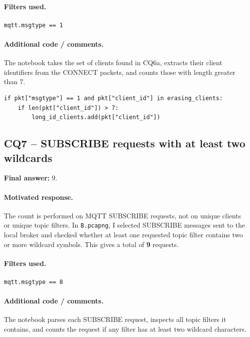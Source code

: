 \documentclass[11pt,a4paper]{article}
\begin{document}
\paragraph{Filters used.}
\begin{verbatim}
mqtt.msgtype == 1
\end{verbatim}

\paragraph{Additional code / comments.}
The notebook takes the set of clients found in CQ6a, extracts their client identifiers from the
CONNECT packets, and counts those with length greater than 7.

\begin{verbatim}
if pkt["msgtype"] == 1 and pkt["client_id"] in erasing_clients:
    if len(pkt["client_id"]) > 7:
        long_id_clients.add(pkt["client_id"])
\end{verbatim}
\subsection*{CQ7 -- SUBSCRIBE requests with at least two wildcards}

\textbf{Final answer:} 9.

\paragraph{Motivated response.}
The count is performed on MQTT SUBSCRIBE requests, not on unique clients or unique topic
filters. In \texttt{B.pcapng}, I selected SUBSCRIBE messages sent to the local broker and checked
whether at least one requested topic filter contains two or more wildcard symbols. This gives
a total of \textbf{9} requests.

\paragraph{Filters used.}
\begin{verbatim}
mqtt.msgtype == 8
\end{verbatim}

\paragraph{Additional code / comments.}
The notebook parses each SUBSCRIBE request, inspects all topic filters it contains, and counts
the request if any filter has at least two wildcard characters.
\end{document}
